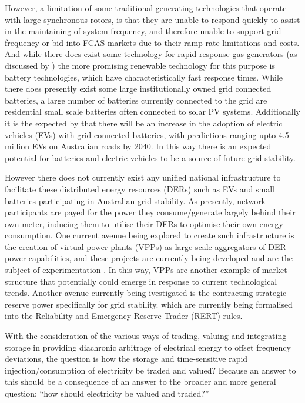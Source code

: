 However, a limitation of some traditional generating technologies that operate with large synchronous rotors, is that they are unable to respond quickly to assist in the maintaining of system frequency, and therefore unable to support grid frequency or bid into FCAS markets due to their ramp-rate limitations and costs. \citep{GONZALEZSALAZAR20181497}
And while there does exist some technology for rapid response gas generators (as discussed by \cite{GONZALEZSALAZAR20181497}) the more promising renewable technology for this purpose is battery technologies, which have characteristically fast response times.
While there does presently exist some large institutionally owned grid connected batteries, a large number of batteries currently connected to the grid are residential small scale batteries often connected to solar PV systems.
Additionally it is the expected by \cite{australianenergymarketoperatorlimited2019} that there will be an increase in the adoption of electric vehicles (EVs) with grid connected batteries, with predictions ranging upto 4.5 million EVs on Australian roads by 2040.
In this way there is an expected potential for batteries and electric vehicles to be a source of future grid stability.

However there does not currently exist any unified national infrastructure to facilitate these distributed energy resources (DERs) such as EVs and small batteries participating in Australian grid stability.
As presently, network participants are payed for the power they consume/generate largely behind their own meter, inducing them to utilise their DERs to optimise their own energy consumption.
One current avenue being explored to create such infrastructure is the creation of virtual power plants (VPPs) as large scale aggregators of DER power capabilities, and these projects are currently being developed and are the subject of experimentation \citep{australianenergymarketoperatorlimited20188}.
In this way, VPPs are another example of market structure that potentially could emerge in response to current technological trends.
Another avenue currently being ivestigated is the contracting strategic reserve power specifically for grid stability. which are currently being formalised into the Reliability and Emergency Reserve Trader (RERT) rules.

With the consideration of the various ways of trading, valuing and integrating storage in providing diachronic arbitrage of electrical energy to offset frequency deviations, the question is how the storage and time-sensitive rapid injection/consumption of electricity be traded and valued? Because an answer to this should be a consequence of an answer to the broader and more general question: ``how should electricity be valued and traded?''


